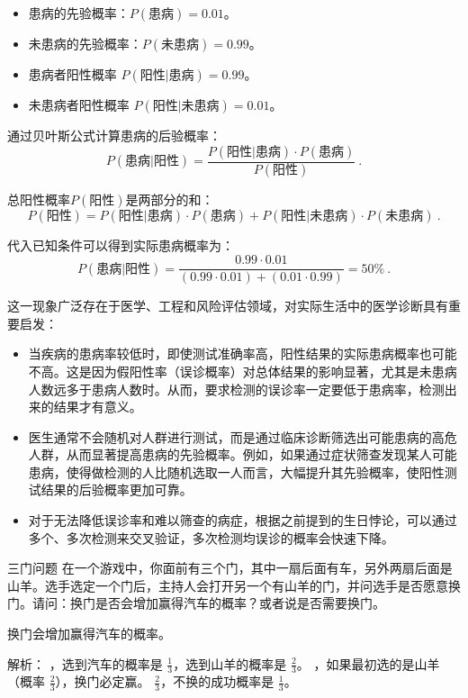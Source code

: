 \begin{itemize}
\item 患病的先验概率：$P(\text{患病}) = 0.01$。
\item 未患病的先验概率：$P(\text{未患病}) = 0.99$。
\item 患病者阳性概率 $P(\text{阳性}|\text{患病}) = 0.99$。
\item 未患病者阳性概率 $P(\text{阳性}|\text{未患病}) = 0.01$。
\end{itemize}

通过贝叶斯公式计算患病的后验概率：
\begin{equation}
P(\text{患病}|\text{阳性}) = \frac{P(\text{阳性}|\text{患病}) \cdot P(\text{患病})}{P(\text{阳性})}~.
\end{equation}

总阳性概率$P(\text{阳性})$是两部分的和：
\begin{equation}
P(\text{阳性}) = P(\text{阳性}|\text{患病}) \cdot P(\text{患病}) + P(\text{阳性}|\text{未患病}) \cdot P(\text{未患病})~.
\end{equation}

代入已知条件可以得到实际患病概率为：
\begin{equation}
P(\text{患病}|\text{阳性}) = \frac{0.99 \cdot 0.01}{(0.99 \cdot 0.01) + (0.01 \cdot 0.99)}= 50\%~.
\end{equation}

这一现象广泛存在于医学、工程和风险评估领域，对实际生活中的医学诊断具有重要启发：
\begin{itemize}
\item 当疾病的患病率较低时，即使测试准确率高，阳性结果的实际患病概率也可能不高。这是因为假阳性率（误诊概率）对总体结果的影响显著，尤其是未患病人数远多于患病人数时。从而，要求检测的误诊率一定要低于患病率，检测出来的结果才有意义。
\item 医生通常不会随机对人群进行测试，而是通过临床诊断筛选出可能患病的高危人群，从而显著提高患病的先验概率。例如，如果通过症状筛查发现某人可能患病，使得做检测的人比随机选取一人而言，大幅提升其先验概率，使阳性测试结果的后验概率更加可靠。
\item 对于无法降低误诊率和难以筛查的病症，根据之前提到的生日悖论，可以通过多个、多次检测来交叉验证，多次检测均误诊的概率会快速下降。
\end{itemize}

\begin{example}{三门问题}
在一个游戏中，你面前有三个门，其中一扇后面有车，另外两扇后面是山羊。选手选定一个门后，主持人会打开另一个有山羊的门，并问选手是否愿意换门。请问：换门是否会增加赢得汽车的概率？或者说是否需要换门。
\end{example}

换门会增加赢得汽车的概率。


解析：
，选到汽车的概率是 $\frac{1}{3}$，选到山羊的概率是 $\frac{2}{3}$。
，如果最初选的是山羊（概率 $\frac{2}{3}$），换门必定赢。
 $\frac{2}{3}$，不换的成功概率是 $\frac{1}{3}$。